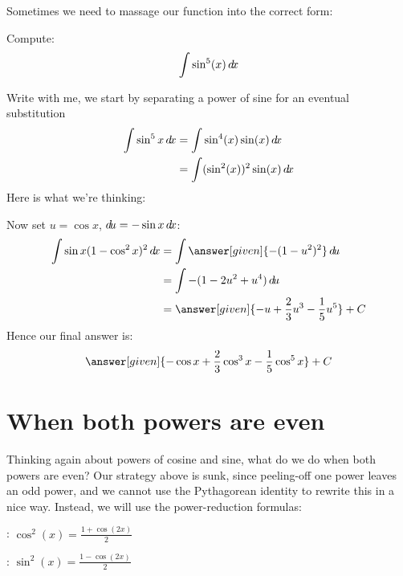 \documentclass{ximera}
\begin{document}
Sometimes we need to massage our function into the correct form:

\begin{example}
  Compute:
  \[
  \int \sin^5(x) \mathop{}\!d\! x
  \]
  \begin{explanation}
    Write with me, we start by separating a power of sine for an eventual substitution
    \begin{align*}
      \int \sin^5 x\mathop{}\!d\! x &=\int \sin^4(x) \sin(x) \mathop{}\!d\! x\\
      &=\int (\sin^2(x))^2 \sin(x) \mathop{}\!d\! x
    \end{align*}
    Here is what we're thinking:
    \begin{center}%
    \end{center}
    Now set $u=\cos x$, $\mathop{}\!d\! u=-\sin x\mathop{}\!d\! x$:
    \begin{align*}
      \int \sin x (1-\cos^2 x)^2\d x&=\int \answer[given]{-(1-u^2)^2} \d u \\
      &=\int -(1-2u^2+u^4)\d u \\
      &=\answer[given]{-u+\frac{2}{3}u^3-\frac{1}{5}u^5}+C
    \end{align*}
    Hence our final answer is:
    \[
    \answer[given]{-\cos x+\frac{2}{3}\cos^3 x-\frac{1}{5}\cos^5x}+C
    \]
  \end{explanation}
\end{example}

\section{When both powers are even}

Thinking again about powers of cosine and sine, what do we do when
both powers are even?  Our strategy above is sunk, since peeling-off
one power leaves an odd power, and we cannot use the Pythagorean
identity to rewrite this in a nice way.  Instead, we will use the
power-reduction formulas:

\begin{description}
\item[Cosine Power-Reduction]: $\cos^2(x)= \frac{1+\cos(2x)}{2}$
\item[Sine Power-Reduction]: $\sin^2(x) = \frac{1-\cos(2x)}{2}$
\end{description}
\end{document}
